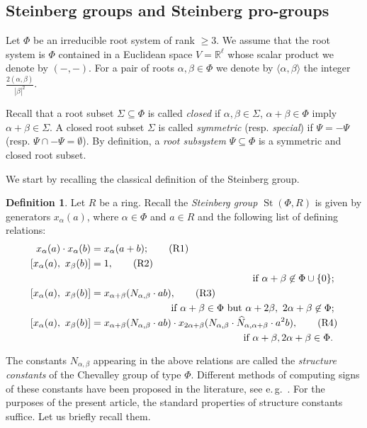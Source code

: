 \documentclass{article}
\numberwithin{equation}{section}
\theoremstyle{definition}
\newtheorem{df}[lemma]{Definition} \Crefname{df}{Definition}{Definitions}
\theoremstyle{remark}
\DeclareMathOperator\St{St}
\begin{document}
\subsection{Steinberg groups and Steinberg pro-groups}
Let $\Phi$ be an irreducible root system of rank $\geq 3$.
We assume that the root system is $\Phi$ contained in a Euclidean space $V = \mathbb{R}^\ell$ whose scalar product we denote by $(-, -)$.
For a pair of roots $\alpha, \beta \in \Phi$ we denote by $\langle \alpha, \beta \rangle$ the integer $\tfrac{2(\alpha, \beta)}{|\beta|^2}$.

Recall that a root subset $\Sigma \subseteq \Phi$ is called {\it closed} if $\alpha, \beta \in \Sigma$, $\alpha+\beta\in\Phi$ imply $\alpha+\beta\in \Sigma$. A closed root subset $\Sigma$ is called {\it symmetric} (resp. {\it special}) if $\Psi = -\Psi$ (resp. $\Psi \cap -\Psi = \emptyset$). By definition, a {\it root subsystem} $\Psi \subseteq \Phi$ is a symmetric and closed root subset.

We start by recalling the classical definition of the Steinberg group.
\begin{df} \label{def:Steinberg}
Let $R$ be a ring. Recall the {\it Steinberg group $\St(\Phi, R)$} is given by generators $x_\alpha(a)$, where $\alpha \in \Phi$ and $a \in R$ and the following list of defining relations:
\begin{align}
 x_\alpha(a) \cdot x_\alpha(b)    &= x_\alpha(a+b); \tag{R1} \label{R1} \\
 [x_\alpha(a),\ x_\beta(b)] &= 1, \tag{R2} \label{R2} \\ 
 \multispan2{\hfil if $\alpha + \beta \not\in\Phi \cup \{0\};$} \nonumber \\
 [x_\alpha(a),\ x_\beta(b)] &= x_{\alpha + \beta}(N_{\alpha,\beta} \cdot ab), \tag{R3} \label{R3} \\
 \multispan2{\hfill if $\alpha+\beta\in\Phi$ but $\alpha+2\beta,\ 2\alpha+\beta\not\in\Phi;$} \nonumber \\
 [x_\alpha(a),\ x_\beta(b)] &= x_{\alpha + \beta}(N_{\alpha,\beta} \cdot ab) \cdot x_{2\alpha+\beta}(N_{\alpha,\beta} \cdot \widehat{N}_{\alpha, \alpha+\beta}\cdot a^2b), \tag{R4} \label{R4} \\ \multispan2{ \hfill if $\alpha+\beta,2\alpha+\beta\in\Phi$.} \nonumber  \end{align}
\end{df}
The constants $N_{\alpha,\beta}$ appearing in the above relations are called the {\it structure constants} of the Chevalley group of type $\Phi$.
Different methods of computing signs of these constants have been proposed in the literature, see e.\,g.~\cite{VP}.
For the purposes of the present article, the standard properties of structure constants suffice. Let us briefly recall them.
\end{document}
